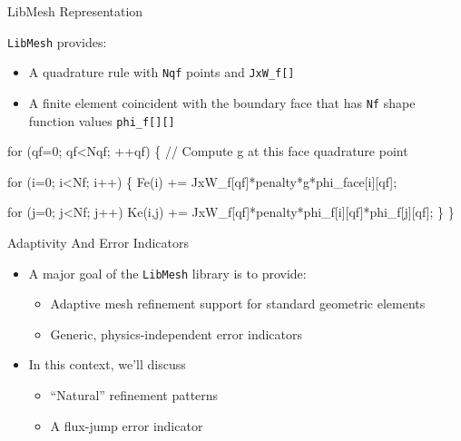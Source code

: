 \begin{frame}[fragile]{LibMesh Representation}

\texttt{LibMesh} provides:
\begin{itemize}
  \item A quadrature rule with \texttt{Nqf} points and \texttt{JxW\_f[]}
  \item A finite element coincident with the boundary face that has \texttt{Nf}
    shape function values \texttt{phi\_f[][]}
\end{itemize}
\scriptsize
\begin{semiverbatim}
for (qf=0; qf<Nqf; ++qf) \{
  // Compute g at this face quadrature point

  for (i=0; i<Nf; i++) \{
    Fe(i) += JxW_f[qf]*penalty*g*phi_face[i][qf];

    for (j=0; j<Nf; j++)
      Ke(i,j) += JxW_f[qf]*penalty*phi_f[i][qf]*phi_f[j][qf];
  \}
\}
\end{semiverbatim}

\end{frame}




\begin{frame}{Adaptivity And Error Indicators}
  \begin{itemize}

  \item A major goal of the \texttt{LibMesh} library is to provide:
    \begin{itemize}
    \item Adaptive mesh refinement support for standard geometric elements
    \item Generic, physics-independent error indicators
  \end{itemize}

  \item In this context, we'll discuss
    \begin{itemize}
    \item ``Natural'' refinement patterns
    \item A flux-jump error indicator
  \end{itemize}


  \end{itemize}
\end{frame}




